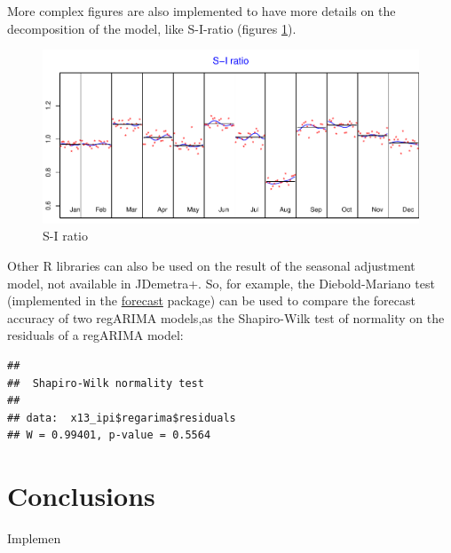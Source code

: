 \documentclass[]{article}
\newenvironment{Shaded}{\begin{snugshade}}{\end{snugshade}}
\newcommand{\KeywordTok}[1]{\textcolor[rgb]{0.13,0.29,0.53}{\textbf{#1}}}
\newcommand{\DataTypeTok}[1]{\textcolor[rgb]{0.13,0.29,0.53}{#1}}
\newcommand{\OtherTok}[1]{\textcolor[rgb]{0.56,0.35,0.01}{#1}}
\newcommand{\OperatorTok}[1]{\textcolor[rgb]{0.81,0.36,0.00}{\textbf{#1}}}
\newcommand{\NormalTok}[1]{#1}
\begin{document}
More complex figures are also implemented to have more details on the
decomposition of the model, like S-I-ratio (figures
\ref{fig:sa_si_ratio}).

\begin{Shaded}
\end{Shaded}

\begin{figure}
\centering
\includegraphics{NTTS_files/figure-latex/unnamed-chunk-3-1.pdf}
\caption{\label{fig:sa_si_ratio}S-I ratio}
\end{figure}

Other R libraries can also be used on the result of the seasonal
adjustment model, not available in JDemetra+. So, for example, the
Diebold-Mariano test (implemented in the
\href{ttps://CRAN.R-project.org/package=forecast}{forecast} package) can
be used to compare the forecast accuracy of two regARIMA models,as the
Shapiro-Wilk test of normality on the residuals of a regARIMA model:

\begin{Shaded}
\end{Shaded}

\begin{verbatim}
## 
##  Shapiro-Wilk normality test
## 
## data:  x13_ipi$regarima$residuals
## W = 0.99401, p-value = 0.5564
\end{verbatim}

\section{Conclusions}\label{conclusions}

Implemen
\end{document}
